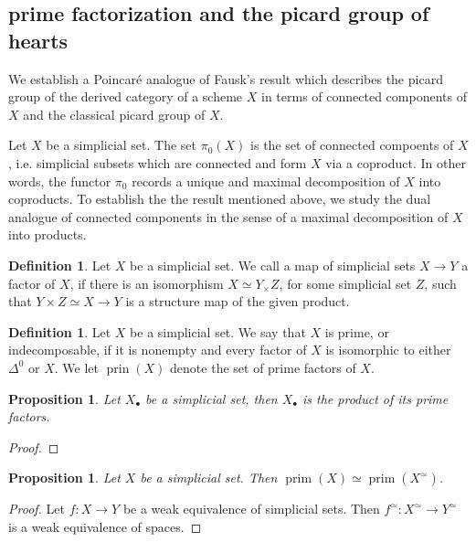 \documentclass{article}
\newtheorem{proposition}[equation]{Proposition}
\theoremstyle{definition}
\newtheorem{definition}[equation]{Definition}
\newcommand{\Viktor}[1]{\todo{V: #1}}
\begin{document}
\subsection{prime factorization and the picard group of hearts}\Viktor{still in development}
We establish a Poincaré analogue of Fausk's result which describes the picard group of the derived category of a scheme $X$ in terms of connected components of $X$ and the classical picard group of $X$.

Let $X$ be a simplicial set. The set $\pi_0(X)$ is the set of connected compoents of $X$, i.e. simplicial subsets which are connected and form $X$ via a coproduct. In other words, the functor $\pi_0$ records a unique and maximal decomposition of $X$ into coproducts. To establish the the result mentioned above, we study the dual analogue of connected components in the sense of a maximal decomposition of $X$ into products. %

\begin{definition}\label{definition:factor}
    Let $X$ be a simplicial set. We call a map of simplicial sets $X\rightarrow Y$ a factor of $X$, if there is an isomorphism $X\simeq Y_\times Z$, for some simplicial set $Z$, such that $Y \times Z\simeq X\rightarrow Y$ is a structure map of the given product.
\end{definition}

\begin{definition}\label{definition:prime_indecomposable}
    Let $X$ be a simplicial set. We say that $X$ is prime, or indecomposable, if it is nonempty and every factor of $X$ is isomorphic to  either $\Delta^0$ or $X$. We let $\operatorname{prin}(X)$ denote the set of prime factors of $X$.
\end{definition}

\begin{proposition}\label{proposition:prime_factorization}
    Let $X_\bullet$ be a simplicial set, then $X_\bullet$ is the product of its prime factors.
\end{proposition}
\begin{proof}
    \Viktor{}
\end{proof}

\begin{proposition}
    Let $X$ be a simplicial set. Then $\operatorname{prim}(X)\simeq \operatorname{prim}(X^\simeq)$.
\end{proposition}
\begin{proof}
    Let $f:X\rightarrow Y$ be a weak equivalence of simplicial sets. Then $f^\simeq: X^\simeq\rightarrow Y^\simeq$ is a weak equivalence of spaces. \Viktor{}
\end{proof}
\end{document}
